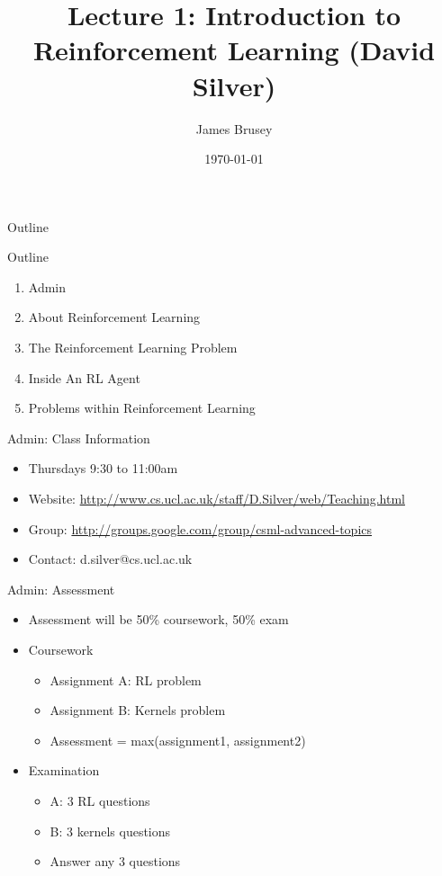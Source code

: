 \documentclass[presentation]{beamer}
\author{James Brusey}
\date{\today}
\title{Lecture 1: Introduction to Reinforcement Learning (David Silver)}
\begin{document}
\maketitle
\begin{frame}{Outline}
\setcounter{tocdepth}{2}
\tableofcontents
\end{frame}

\begin{frame}[label={sec:org89fcfb6}]{Outline}
\begin{enumerate}
\item Admin
\item About Reinforcement Learning
\item The Reinforcement Learning Problem
\item Inside An RL Agent
\item Problems within Reinforcement Learning
\end{enumerate}
\end{frame}
\begin{frame}[label={sec:org3795e19}]{Admin: Class Information}
\begin{itemize}
\item Thursdays 9:30 to 11:00am
\item Website: \url{http://www.cs.ucl.ac.uk/staff/D.Silver/web/Teaching.html}
\item Group: \url{http://groups.google.com/group/csml-advanced-topics}
\item Contact: d.silver@cs.ucl.ac.uk
\end{itemize}
\end{frame}
\begin{frame}[label={sec:org8fd728a}]{Admin: Assessment}
\begin{itemize}
\item Assessment will be 50\% coursework, 50\% exam
\item Coursework
\begin{itemize}
\item Assignment A: RL problem
\item Assignment B: Kernels problem
\item Assessment = max(assignment1, assignment2)
\end{itemize}
\item Examination
\begin{itemize}
\item A: 3 RL questions
\item B: 3 kernels questions
\item Answer any 3 questions
\end{itemize}
\end{itemize}
\end{frame}
\end{document}
